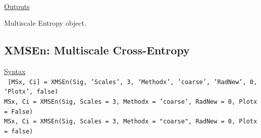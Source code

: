 \documentclass[12pt, a4paper, titlepage, openany]{book}
\begin{document}
\ \\ \noindent \ul{Outputs}
\begin{description}[labelsep=1cm, labelwidth=2cm, nosep, style=multiline,leftmargin=4cm]\footnotesize
\item[\texttt{Mobj}]		Multiscale Entropy object.
\end{description}



\newpage
\subsection{\normalsize XMSEn: \hspace{15mm} Multiscale Cross-Entropy}
\noindent\ul{Syntax} \vspace{6mm} \\ \noindent \texttt{\footnotesize
[MSx, Ci] = XMSEn(Sig, 'Scales', 3, ‘Methodx’, 'coarse', 'RadNew', 0, ‘Plotx’, false)\\
MSx, Ci = XMSEn(Sig, Scales = 3, Methodx = 'coarse', RadNew = 0, Plotx = False)\\ 
MSx, Ci = XMSEn(Sig, Scales = 3, Methodx = "coarse", RadNew = 0, Plotx = false)}
\end{document}
